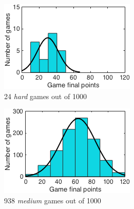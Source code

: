 \begin{figure}[h]
        \centering
        \begin{subfigure}[h]{0.32\textwidth}
                \includegraphics[width=\textwidth]{./img/appendix/histHhard}
                \caption{24 \emph{hard} games out of 1000}
                \label{app:histHhard}
        \end{subfigure}
        \begin{subfigure}[h]{0.32\textwidth}
                \includegraphics[width=\textwidth]{./img/appendix/histHmedium}
                \caption{938 \emph{medium} games out of 1000}
                \label{app:histHmedium}
        \end{subfigure}
        \begin{subfigure}[h]{0.32\textwidth}

\end{subfigure}
\end{figure}
